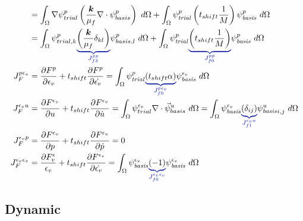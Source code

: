 \begin{align}
&= \int_{\Omega} \nabla \psi_{trial}^ p \left(\frac{\tensor{k}}{\mu_{f}} \nabla \cdot \psi_{basis}^p \right) \ d\Omega +
 \int_{\Omega} \trialscalar[p] \left(t_{shift} \frac{1}{M}\right) \basisscalar[p] \ d\Omega \\
&= \int_{\Omega} \psi_{trial,k}^p \eqnannotate{\left(\frac{\tensor{k}}{\mu_{f}} \delta_{kl}\right)}{J_{f3}^{pp}} \psi_{basis,l}^p \ d\Omega +
\int_{\Omega} \trialscalar[p] \eqnannotate{\left(t_{shift} \frac{1}{M}\right)}{J_{f0}^{pp}} \basisscalar[p] \ d\Omega \\
%
J_F^{p\epsilon_{v}} &= \frac{\partial F^p}{\partial \epsilon_{v}} + t_{shift} \frac{\partial
F^p}{\partial \dot{\epsilon_{v}}} = \int_{\Omega} \trialscalar[p] \eqnannotate{\left(t_{shift} \alpha \right)}{J_{f0}^{p\epsilon_{v}}}
\basisscalar[\epsilon_{v}] \ d\Omega \\
%
J_F^{\epsilon_{v}u} &= \frac{\partial F^{\epsilon_{v}}}{\partial u} + t_{shift} \frac{\partial F^{\epsilon_{v}}}{\partial \dot{u}} =
\int_{\Omega} \psi_{trial}^{\epsilon_{v}} \nabla \cdot \vec{\psi}_{basis}^u \ d\Omega = \int_{\Omega}
\basisscalar[\epsilon_{v}] \eqnannotate{\left(\delta_{ij}\right)}{J_{f1}^{\epsilon_{v}u}}
\basisscalar[u]_{i,j} \ d\Omega\\
%
%
J_F^{\epsilon_{v}p} &= \frac{\partial F^{\epsilon_{v}}}{\partial p} + t_{shift} \frac{\partial F^{\epsilon_{v}}}{\partial \dot{p}} = 0 \\
%
%
J_F^{\epsilon_{v}\epsilon_{v}} &= \frac{\partial F^\epsilon_{v}}{\epsilon_{v}} + t_{shift} \frac{\partial F^{\epsilon_{v}}}{\partial \dot{\epsilon_{v}}} =
\int_{\Omega} \basisscalar[\epsilon_{v}] \eqnannotate{\left(-1\right)}{J_{f0}^{\epsilon_{v}\epsilon_{v}}} \basisscalar[\epsilon_{v}] \ d\Omega
\end{align}

\subsection{Dynamic}

